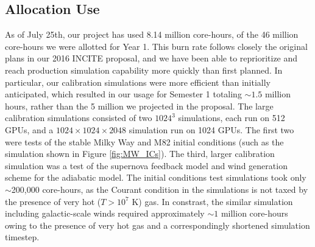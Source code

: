 \documentclass[11pt,letterpaper,english]{article}
\begin{document}
\subsection{Allocation Use} 

As of July 25th, our project has used 8.14 million core-hours, of the 46 million core-hours we were allotted for Year 1. This burn rate follows closely the original plans in our 2016 INCITE proposal, and we have been
able to reprioritize and reach production simulation capability more quickly than first planned. In particular, our calibration simulations were more efficient than initially anticipated, which resulted in our usage for Semester 1 totaling $\sim1.5$ million hours, rather than the 5 million we projected in the proposal. The large calibration simulations consisted of two $1024^3$ simulations, each run on 512 GPUs, and a $1024\times1024\times2048$ simulation run on 1024 GPUs. The first two were tests of the stable Milky Way and M82 initial conditions (such as the simulation shown in Figure \ref{fig:MW_ICs}). The third, larger calibration simulation was a test of the supernova feedback model and wind generation scheme for the adiabatic model. The initial conditions test simulations took only $\sim$200,000 core-hours, as the Courant condition in the simulations is not
taxed by the presence of very hot ($T > 10^7$ K) gas. In constrast, the similar simulation 
including galactic-scale winds required approximately $\sim1$ million core-hours owing to the 
presence of very hot gas and a correspondingly shortened simulation timestep.
~\\~\\
\end{document}
